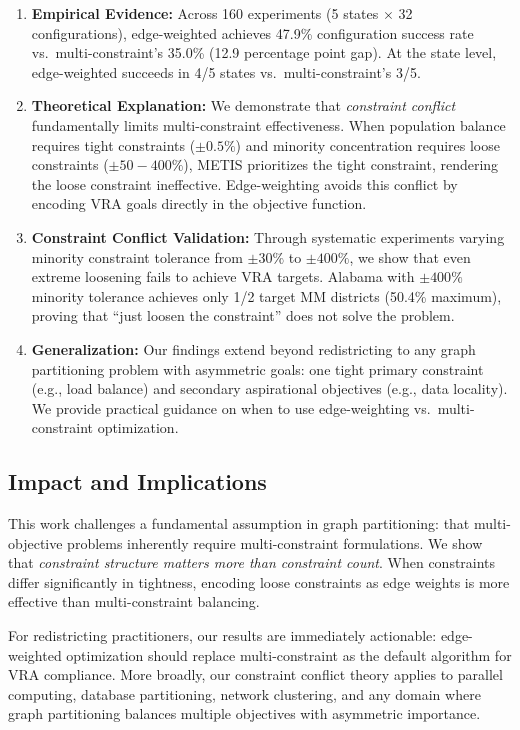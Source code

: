 \begin{enumerate}
    \item \textbf{Empirical Evidence:} Across 160 experiments (5 states $\times$ 32 configurations), edge-weighted achieves 47.9\% configuration success rate vs.~multi-constraint's 35.0\% (12.9 percentage point gap). At the state level, edge-weighted succeeds in 4/5 states vs.~multi-constraint's 3/5.

    \item \textbf{Theoretical Explanation:} We demonstrate that \textit{constraint conflict} fundamentally limits multi-constraint effectiveness. When population balance requires tight constraints ($\pm0.5\%$) and minority concentration requires loose constraints ($\pm50-400\%$), METIS prioritizes the tight constraint, rendering the loose constraint ineffective. Edge-weighting avoids this conflict by encoding VRA goals directly in the objective function.

    \item \textbf{Constraint Conflict Validation:} Through systematic experiments varying minority constraint tolerance from $\pm30\%$ to $\pm400\%$, we show that even extreme loosening fails to achieve VRA targets. Alabama with $\pm400\%$ minority tolerance achieves only 1/2 target MM districts (50.4\% maximum), proving that ``just loosen the constraint'' does not solve the problem.

    \item \textbf{Generalization:} Our findings extend beyond redistricting to any graph partitioning problem with asymmetric goals: one tight primary constraint (e.g., load balance) and secondary aspirational objectives (e.g., data locality). We provide practical guidance on when to use edge-weighting vs.~multi-constraint optimization.
\end{enumerate}

\subsection{Impact and Implications}

This work challenges a fundamental assumption in graph partitioning: that multi-objective problems inherently require multi-constraint formulations. We show that \textit{constraint structure matters more than constraint count}. When constraints differ significantly in tightness, encoding loose constraints as edge weights is more effective than multi-constraint balancing.

For redistricting practitioners, our results are immediately actionable: edge-weighted optimization should replace multi-constraint as the default algorithm for VRA compliance. More broadly, our constraint conflict theory applies to parallel computing, database partitioning, network clustering, and any domain where graph partitioning balances multiple objectives with asymmetric importance.


